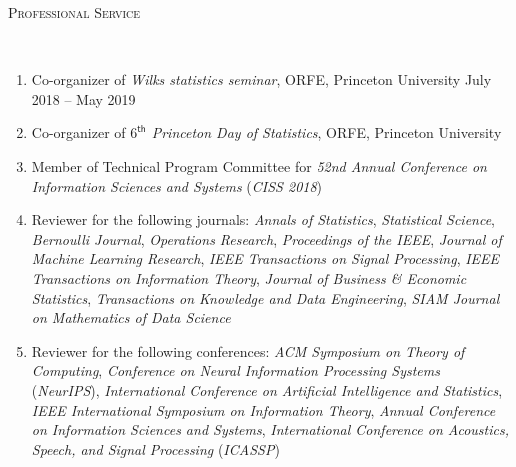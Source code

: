 \documentclass[a4paper, 10pt]{article}
\newenvironment{changemargin}[2]{%
  \begin{list}{}{%
    \setlength{\topsep}{0pt}%
    \setlength{\leftmargin}{#1}%
    \setlength{\rightmargin}{#2}%
    \setlength{\listparindent}{\parindent}%
    \setlength{\itemindent}{\parindent}%
    \setlength{\parsep}{\parskip}%
  }%
  \item[]}{\end{list}
}
\newcommand{\lineover}{
	\begin{changemargin}{-0.05in}{-0.05in}
		\vspace*{-8pt}
		\hrulefill \\
		\vspace*{-2pt}
	\end{changemargin}
}
\newcommand{\header}[1]{
	\begin{changemargin}{-0.5in}{-0.5in}
		\scshape{#1}\\
  	\lineover
	\end{changemargin}
}
\newenvironment{body} {
	\vspace*{-16pt}
	\begin{changemargin}{-0.3in}{-0.5in}
  }	
	{\end{changemargin}
}
\begin{document}
%
\bigskip
\header{\LARGE{Professional Service}}
\begin{body}
	\vspace{18pt}
	\begin{enumerate}
	\item Co-organizer of \emph{Wilks statistics seminar}, ORFE, Princeton University \hfill July 2018 -- May 2019
	\item Co-organizer of \emph{$6^{\mathsf{th}}$ Princeton Day of Statistics}, ORFE, Princeton University
	\item Member of Technical Program Committee for \emph{52nd Annual Conference on Information Sciences and Systems} (\emph{CISS 2018})
	\item Reviewer for the following journals: \emph{Annals of Statistics}, \emph{Statistical Science}, \emph{Bernoulli Journal}, \emph{Operations Research}, \emph{Proceedings of the IEEE}, \emph{Journal of Machine Learning Research}, \emph{IEEE Transactions on Signal Processing}, \emph{IEEE Transactions on Information Theory}, \emph{Journal of Business \& Economic Statistics}, \emph{Transactions on Knowledge and Data Engineering}, \emph{SIAM Journal on Mathematics of Data Science}
	\item Reviewer for the following conferences: \emph{ACM Symposium on Theory of Computing}, \emph{Conference on Neural Information Processing Systems} (\emph{NeurIPS}), \emph{International Conference on Artificial Intelligence and Statistics}, \emph{IEEE International Symposium on Information Theory}, \emph{Annual Conference on Information Sciences and Systems}, \emph{International Conference on Acoustics, Speech, and Signal Processing} (\emph{ICASSP})

	\end{enumerate}
\end{body}
\end{document}
